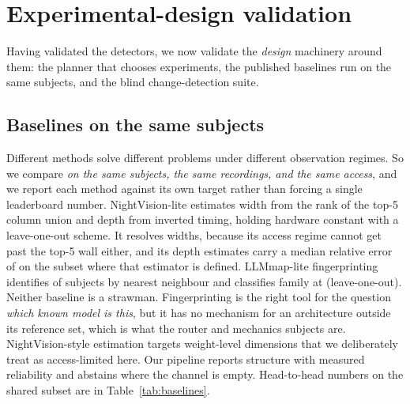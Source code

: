 \section{Experimental-design validation}
\label{sec:design}
Having validated the detectors, we now validate the \emph{design} machinery around
them: the planner that chooses experiments, the published baselines run on the same
subjects, and the blind change-detection suite.

\subsection{Baselines on the same subjects}
\label{sec:baselines}
Different methods solve different problems under different observation regimes.  So we
compare \emph{on the same subjects, the same recordings, and the same access}, and we
report each method against its own target rather than forcing a single leaderboard
number.  NightVision-lite estimates width from the rank of the top-5 column union and
depth from inverted timing, holding hardware constant with a leave-one-out scheme.  It
resolves \NVWidthResolved{} widths, because its access regime cannot get past the top-5
wall either, and its depth estimates carry a median relative error of \NVDepthErr{} on
the subset where that estimator is defined.  LLMmap-lite fingerprinting identifies
\LLMmapIdent{} of subjects by nearest neighbour and classifies family at \LLMmapFam{}
(leave-one-out).  Neither baseline is a strawman.  Fingerprinting is the right tool for
the question \emph{which known model is this}, but it has no mechanism for an
architecture outside its reference set, which is what the router and mechanics subjects
are.  NightVision-style estimation targets weight-level dimensions that we deliberately
treat as access-limited here.  Our pipeline reports structure with measured reliability
and abstains where the channel is empty.  Head-to-head numbers on the shared subset are
in Table~\ref{tab:baselines}.

\begin{table}[h]\centering\small
\caption{Baselines on the same \benchname{} subjects, recordings, and access regime.
This is an apples-to-apples comparison on the shared subset, not a claim that one method
dominates another: fingerprinting identifies known models, NV-lite estimates dimensions
under top-5 access, and this paper reports partial identification with abstention.}
\label{tab:baselines}

\end{table}

